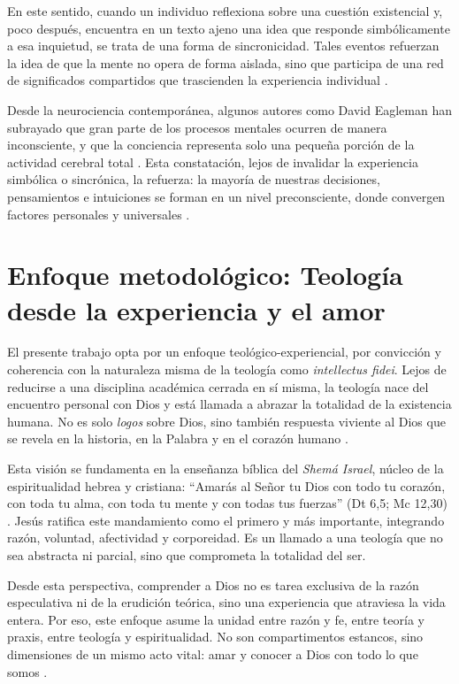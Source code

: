 En este sentido, cuando un individuo reflexiona sobre una cuestión existencial y, poco después, encuentra en un texto ajeno una idea que responde simbólicamente a esa inquietud, se trata de una forma de sincronicidad. Tales eventos refuerzan la idea de que la mente no opera de forma aislada, sino que participa de una red de significados compartidos que trascienden la experiencia individual \cite{jung1959}.

Desde la neurociencia contemporánea, algunos autores como David Eagleman han subrayado que gran parte de los procesos mentales ocurren de manera inconsciente, y que la conciencia representa solo una pequeña porción de la actividad cerebral total \cite{eagleman2011}. Esta constatación, lejos de invalidar la experiencia simbólica o sincrónica, la refuerza: la mayoría de nuestras decisiones, pensamientos e intuiciones se forman en un nivel preconsciente, donde convergen factores personales y universales \cite{jung1959}.



\section*{Enfoque metodológico: Teología desde la experiencia y el amor}

El presente trabajo opta por un enfoque teológico-experiencial, por convicción y coherencia con la naturaleza misma de la teología como \textit{intellectus fidei}. Lejos de reducirse a una disciplina académica cerrada en sí misma, la teología nace del encuentro personal con Dios y está llamada a abrazar la totalidad de la existencia humana. No es solo \textit{logos} sobre Dios, sino también respuesta viviente al Dios que se revela en la historia, en la Palabra y en el corazón humano \cite{jung1959}.

Esta visión se fundamenta en la enseñanza bíblica del \textit{Shemá Israel}, núcleo de la espiritualidad hebrea y cristiana: ``Amarás al Señor tu Dios con todo tu corazón, con toda tu alma, con toda tu mente y con todas tus fuerzas'' (Dt 6,5; Mc 12,30) \cite{Biblia}. Jesús ratifica este mandamiento como el primero y más importante, integrando razón, voluntad, afectividad y corporeidad. Es un llamado a una teología que no sea abstracta ni parcial, sino que comprometa la totalidad del ser.

Desde esta perspectiva, comprender a Dios no es tarea exclusiva de la razón especulativa ni de la erudición teórica, sino una experiencia que atraviesa la vida entera. Por eso, este enfoque asume la unidad entre razón y fe, entre teoría y praxis, entre teología y espiritualidad. No son compartimentos estancos, sino dimensiones de un mismo acto vital: amar y conocer a Dios con todo lo que somos \cite{jung1959}.

